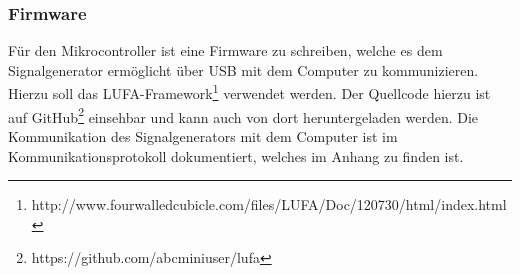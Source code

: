 \subsubsection{Firmware}
Für den Mikrocontroller ist eine Firmware zu schreiben, welche es dem Signalgenerator ermöglicht über USB mit dem Computer zu kommunizieren. Hierzu soll das LUFA-Framework\footnote{http://www.fourwalledcubicle.com/files/LUFA/Doc/120730/html/index.html} verwendet werden. Der Quellcode hierzu ist auf GitHub\footnote{https://github.com/abcminiuser/lufa} einsehbar und kann auch von dort heruntergeladen werden. Die Kommunikation des Signalgenerators mit dem Computer ist im Kommunikationsprotokoll dokumentiert, welches im Anhang zu finden ist.
